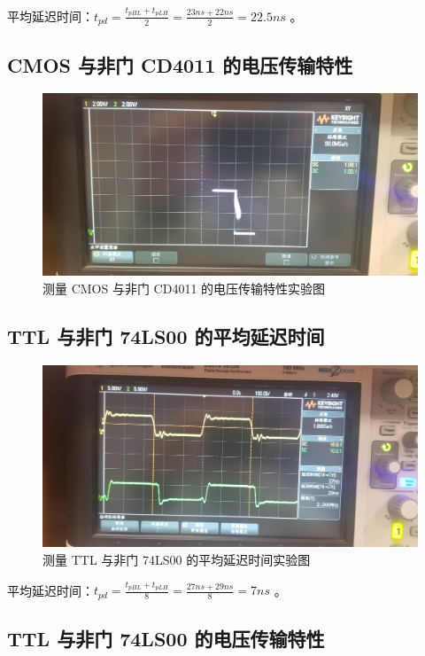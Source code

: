 \documentclass[a4paper]{article}
\begin{document}
        \par 平均延迟时间：$t_{pd}=\frac{t_{pHL}+t_{pLH}}{2}=\frac{23ns + 22ns}{2}=22.5ns$ 。

    \subsection{CMOS 与非门 CD4011 的电压传输特性}

        \begin{figure}[H]
            \centering
            \includegraphics[width=0.7\linewidth]{figures/f5}
            \caption{测量 CMOS 与非门 CD4011 的电压传输特性实验图}
        \end{figure}

    \subsection{TTL 与非门 74LS00 的平均延迟时间}

        \begin{figure}[H]
            \centering
            \includegraphics[width=0.7\linewidth]{figures/f6}
            \caption{测量 TTL 与非门 74LS00 的平均延迟时间实验图}
        \end{figure}

        \par 平均延迟时间：$t_{pd}=\frac{t_{pHL}+t_{pLH}}{8}=\frac{27ns + 29ns}{8}=7ns$ 。

    \subsection{TTL 与非门 74LS00 的电压传输特性}
\end{document}
